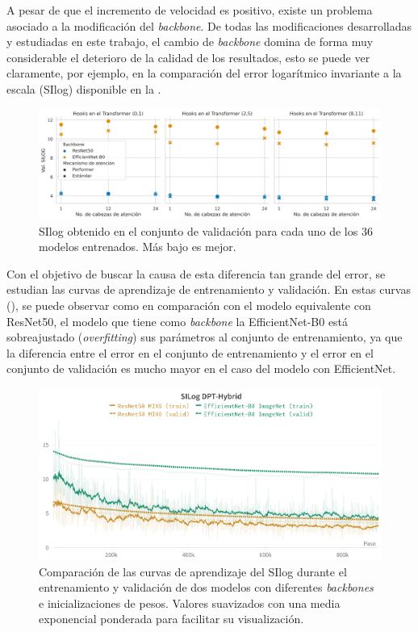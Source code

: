 A pesar de que el incremento de velocidad es positivo, existe un problema asociado a la modificación del \textit{backbone}. De todas las modificaciones desarrolladas y estudiadas en este trabajo, el cambio de \textit{backbone} domina de forma muy considerable el deterioro de la calidad de los resultados, esto se puede ver claramente, por ejemplo, en la comparación del error logarítmico invariante a la escala (SIlog) disponible en la .

\begin{figure}[H]
\centering
\includegraphics[width=\linewidth]{imagenes/Resultados/SIlog_val.png} 
\captionsetup{width=.95\linewidth}
\caption{SIlog obtenido en el conjunto de validación para cada uno de los 36 modelos entrenados. Más bajo es mejor.}
\label{fig:SIlog-validation}
\end{figure}

Con el objetivo de buscar la causa de esta diferencia tan grande del error, se estudian las curvas de aprendizaje de entrenamiento y validación. En estas curvas (), se puede observar como en comparación con el modelo equivalente con ResNet50, el modelo que tiene como \textit{backbone} la EfficientNet-B0 está sobreajustado (\textit{overfitting}) sus parámetros al conjunto de entrenamiento, ya que la diferencia entre el error en el conjunto de entrenamiento y el error en el conjunto de validación es mucho mayor en el caso del modelo con EfficientNet.

\begin{figure}[H]
\centering
\includegraphics[width=\linewidth]{imagenes/Resultados/EfficientNet_overfitting.png} 
\captionsetup{width=.95\linewidth}
\caption{Comparación de las curvas de aprendizaje del SIlog durante el entrenamiento y validación de dos modelos con diferentes \textit{backbones} e inicializaciones de pesos. Valores suavizados con una media exponencial ponderada para facilitar su visualización.}
\label{fig:efficientnet-overfitting}
\end{figure}

